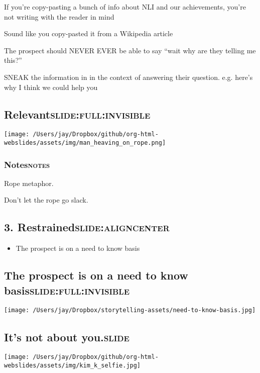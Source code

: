 \documentclass[12pt]{article}
\begin{document}
If you're copy-pasting a bunch of info about NLI and our achievements, you're not writing with the reader in mind

Sound like you copy-pasted it from a Wikipedia article

The prospect should NEVER EVER be able to say ``wait why are they telling me this?''

SNEAK the information in in the context of answering their question. e.g. here's why I think we could help you

\subsection[Relevant]{Relevant\hfill{}\textsc{slide:full:invisible}}
\label{sec:orgaa0e530}
\begin{center}
\texttt{[image: /Users/jay/Dropbox/github/org-html-webslides/assets/img/man\_heaving\_on\_rope.png]}
\end{center}

\subsubsection[Notes]{Notes\hfill{}\textsc{notes}}
\label{sec:org80ac82b}
Rope metaphor.

Don't let the rope go slack.

\subsection[3. Restrained]{3. Restrained\hfill{}\textsc{slide:aligncenter}}
\label{sec:orgf2cfc84}
\begin{itemize}
\item The prospect is on a need to know basis
\end{itemize}

\subsection[The prospect is on a need to know basis]{The prospect is on a need to know basis\hfill{}\textsc{slide:full:invisible}}
\label{sec:org159f75a}
\begin{center}
\texttt{[image: /Users/jay/Dropbox/storytelling-assets/need-to-know-basis.jpg]}
\end{center}

\subsection[It's not about you.]{It's not about you.\hfill{}\textsc{slide}}
\label{sec:org8c57f92}
\begin{center}
\texttt{[image: /Users/jay/Dropbox/github/org-html-webslides/assets/img/kim\_k\_selfie.jpg]}
\end{center}
\end{document}
